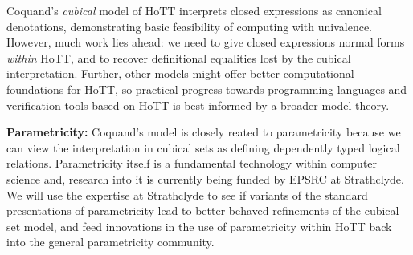 \documentclass[a4paper,11pt]{article}
\begin{document}



Coquand's \emph{cubical} model of HoTT interprets closed expressions
as canonical denotations, demonstrating basic feasibility of computing
with univalence. However, much work lies ahead: we need to give
closed expressions normal forms \emph{within} HoTT, and to recover
definitional equalities lost by the cubical interpretation. Further, other models might
offer better computational foundations for HoTT, so practical progress
towards programming languages and verification tools based on HoTT
is best informed by a broader model theory.


{\bf Parametricity:} Coquand's model is closely reated to
parametricity because we can view the interpretation in cubical sets
as defining dependently typed logical relations.
Parametricity
itself is a fundamental technology within computer science and,
research into it is currently being funded by EPSRC at Strathclyde. We
will use the expertise at Strathclyde to see if variants of the
standard presentations of parametricity lead to better behaved
refinements of the cubical set model, and feed innovations in the use
of parametricity within HoTT back into the general parametricity
community.




\end{document}
